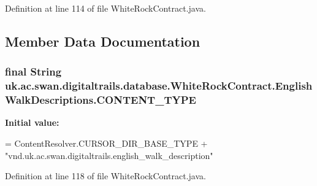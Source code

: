 Definition at line 114 of file White\+Rock\+Contract.\+java.



\subsection{Member Data Documentation}
\hypertarget{classuk_1_1ac_1_1swan_1_1digitaltrails_1_1database_1_1_white_rock_contract_1_1_english_walk_descriptions_afca9b10cbc3a532771e457c07678375d}{
\subsubsection[{C\+O\+N\+T\+E\+N\+T\+\_\+\+T\+Y\+P\+E}]{\setlength{\rightskip}{0pt plus 5cm}final String uk.\+ac.\+swan.\+digitaltrails.\+database.\+White\+Rock\+Contract.\+English\+Walk\+Descriptions.\+C\+O\+N\+T\+E\+N\+T\+\_\+\+T\+Y\+P\+E\hspace{0.3cm}{\ttfamily [static]}}}\label{classuk_1_1ac_1_1swan_1_1digitaltrails_1_1database_1_1_white_rock_contract_1_1_english_walk_descriptions_afca9b10cbc3a532771e457c07678375d}
{\bfseries Initial value\+:}
\begin{DoxyCode}
= ContentResolver.CURSOR\_DIR\_BASE\_TYPE +
                \textcolor{stringliteral}{"vnd.uk.ac.swan.digitaltrails.english\_walk\_description"}
\end{DoxyCode}


Definition at line 118 of file White\+Rock\+Contract.\+java.

